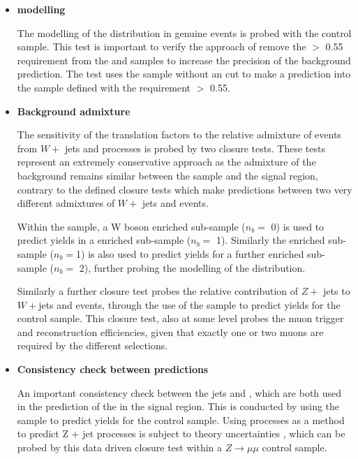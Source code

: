 \begin{itemize}

\item[] \textbf{\alphat modelling}

The modelling of the \alphat distribution in genuine \met events is probed with the \mupjets control sample. This test is important to verify the approach of remove the \alphat $>$ 0.55 requirement from the \mupjets and \dimupjets samples to increase the precision of the background prediction. The test uses the \mupjets sample without an \alphat cut to make a prediction into the \mupjets sample defined with the requirement  \alphat $>$ 0.55.

\item[] \textbf{Background admixture}

The sensitivity of the translation factors to the relative admixture of events from $W +$ jets and \ttbar processes is probed by two closure tests. These tests represent an extremely conservative approach as the admixture of the background remains similar between the \mupjets sample and the signal region, contrary to the defined closure tests which make predictions between two very different admixtures of $W +$ jets and \ttbar events.  

Within the \mupjets sample, a W boson enriched sub-sample ($n_{b} =$ 0) is used to predict yields in a \ttbar enriched sub-sample ($n_{b} =$ 1). Similarly the \ttbar enriched sub-sample ($n_{b} =$1) is also used to predict yields for a further enriched \ttbar sub-sample ($n_{b} =$ 2), further probing the modelling of the \nbreco distribution. 

Similarly a further closure test probes the relative contribution of $Z +$ jets to $W +$jets and \ttbar events, through the use of the \mupjets sample to predict yields for the \dimupjets control sample. This closure test, also at some level probes the muon trigger and reconstruction efficiencies, given that exactly one or two muons are required by the different selections.
 
\item[] \textbf{Consistency check between \zinv predictions}

An important consistency check between the \dimupjets jets and \gpjets, which are both used in the prediction of the \zinv in the signal region. This is conducted by using the \gpjets sample to predict yields for the \dimupjets control sample. Using \gpjets processes as a method to predict Z + jet processes is subject to theory uncertainties \cite{CMS-PAS-SUS-08-002}, which can be probed by this data driven closure test within a $Z \rightarrow \mu\mu$ control sample. 


\end{itemize}
